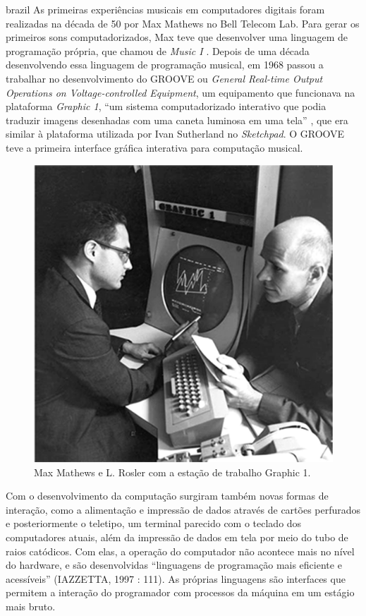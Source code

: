 \begin{otherlanguage*}{brazil}
As primeiras experiências musicais em computadores digitais foram realizadas na década de 50 por Max Mathews no Bell Telecom Lab. Para gerar os primeiros sons computadorizados, Max teve que desenvolver uma linguagem de programação própria, que chamou de \emph{Music I} \cite[253]{Holmes1985}. Depois de uma década desenvolvendo essa linguagem de programação musical, em 1968 passou a trabalhar no desenvolvimento do GROOVE ou \emph{General Real-time Output Operations on Voltage-controlled Equipment}, um equipamento que funcionava na plataforma \emph{Graphic 1}, ``um sistema computadorizado interativo que podia traduzir imagens desenhadas com uma caneta luminosa em uma tela'' \cite[253]{Holmes1985}, que era similar à plataforma utilizada por Ivan Sutherland no \emph{Sketchpad}. O GROOVE teve a primeira interface gráfica interativa para computação musical. 

\begin{figure}[ht]
    \caption{\label{max}Max Mathews e L. Rosler com a estação de trabalho Graphic 1. }
    \begin{center}
        \includegraphics[width=0.5\linewidth]{pictures/MaxHolmes-251}
    \end{center}
\end{figure}

Com o desenvolvimento da computação surgiram também novas formas de interação, como a alimentação e impressão de dados através de cartões perfurados e posteriormente o teletipo, um terminal parecido com o teclado dos computadores atuais, além da impressão de dados em tela por meio do tubo de raios catódicos. Com elas, a operação do computador não acontece mais no nível do hardware, e são desenvolvidas ``linguagens de programação mais eficiente e acessíveis'' (IAZZETTA, 1997 : 111). As próprias linguagens são interfaces que permitem a interação do programador com processos da máquina em um estágio mais bruto.


\end{otherlanguage*}
